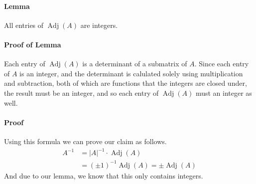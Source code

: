 \documentclass[fleqn]{article}
\newenvironment{answers}{ %
	\begin{enumerate}
		\setlength{\itemsep}{\bigskipamount}
}{\end{enumerate}}
\newcommand{\Adj}{\operatorname{Adj}}
\begin{document}
\begin{answers}
		\paragraph{Lemma} All entries of \(\Adj(A)\) are integers.

		\paragraph{Proof of Lemma} Each entry of \(\Adj(A)\) is a determinant of a submatrix of \(A\). Since each entry of \(A\) is an integer, and the determinant is calulated solely using multiplication and subtraction, both of which are functions that the integers are closed under, the result must be an integer, and so each entry of \(\Adj(A)\) must an integer as well.

		\paragraph{Proof} Using this formula we can prove our claim as follows.
		\begin{align*}
			A^{-1} & = |A|^{-1}\cdot \Adj(A) \\
			       & = (\pm1)^{-1}\Adj(A) = \pm\Adj(A)
		\end{align*}
		And due to our lemma, we know that this only contains integers.
\end{answers}
\end{document}
